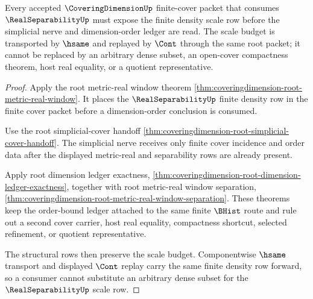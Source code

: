 \begin{theorem}
\label{thm:coveringdimension-root-real-separability-scale-budget}
Every accepted $\CoveringDimensionUp$ finite-cover packet that consumes $\RealSeparabilityUp$ must expose the finite density scale row before the simplicial nerve and dimension-order ledger are read. The scale budget is transported by $\hsame$ and replayed by $\Cont$ through the same root packet; it cannot be replaced by an arbitrary dense subset, an open-cover compactness theorem, host real equality, or a quotient representative.
\end{theorem}
\begin{proof}
Apply the root metric-real window theorem \autoref{thm:coveringdimension-root-metric-real-window}. It places the $\RealSeparabilityUp$ finite density row in the finite cover packet before a dimension-order conclusion is consumed.

Use the root simplicial-cover handoff \autoref{thm:coveringdimension-root-simplicial-cover-handoff}. The simplicial nerve receives only finite cover incidence and order data after the displayed metric-real and separability rows are already present.

Apply root dimension ledger exactness, \autoref{thm:coveringdimension-root-dimension-ledger-exactness}, together with root metric-real window separation, \autoref{thm:coveringdimension-root-metric-real-window-separation}. These theorems keep the order-bound ledger attached to the same finite $\BHist$ route and rule out a second cover carrier, host real equality, compactness shortcut, selected refinement, or quotient representative.

The structural rows then preserve the scale budget. Componentwise $\hsame$ transport and displayed $\Cont$ replay carry the same finite density row forward, so a consumer cannot substitute an arbitrary dense subset for the $\RealSeparabilityUp$ scale row.
\end{proof}

